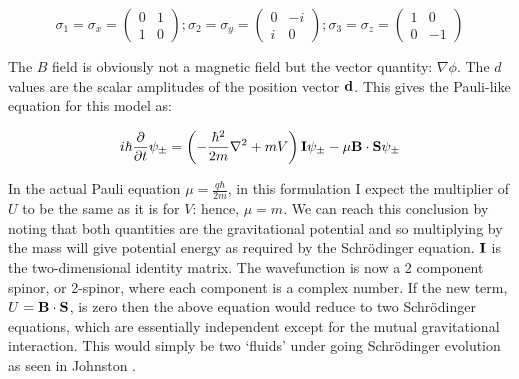 
\begin{equation}
\sigma_1 = \sigma_x =
\begin{pmatrix}
0&1\\
1&0
\end{pmatrix};
\sigma_2 = \sigma_y =
\begin{pmatrix}
0&-i\\
i&0
\end{pmatrix};
\sigma_3 = \sigma_z =
\begin{pmatrix}
1&0\\
0&-1
\end{pmatrix}
\end{equation}

\vspace*{0.5cm}

\noindent The $B$ field is obviously not a magnetic field but the vector quantity: $\nabla \phi$. The $d$ values are the scalar amplitudes of the position vector ${\bf d}$. This gives the Pauli-like equation for this model as:

\begin{equation}
i\hbar\frac{\partial}{\partial t}\psi_\pm = \left( -\frac{\hbar^2}{2m} \nabla^2 + mV \right) {\bf I} \psi_\pm -\mu {\bf B}  \cdot {\bf S} \psi_\pm
\end{equation}

\noindent In the actual Pauli equation $\mu = \frac{q \hbar}{2m}$, in this formulation I expect the multiplier of $U$ to be the same as it is for $V$: hence, $\mu = m$. We can reach this conclusion by noting that both quantities are the gravitational potential and so multiplying by the mass will give potential energy as required by the Schr\"odinger equation. ${\bf I}$ is the two-dimensional identity matrix. The wavefunction is now a 2 component spinor, or 2-spinor, where each component is a complex number. If the new term, $U = {\bf B} \cdot {\bf S}$, is zero then the above equation would reduce to two Schr\"odinger equations, which are essentially independent except for the mutual gravitational interaction. This would simply be two `fluids' under going Schr\"odinger evolution as seen in Johnston \citep{bib_rj}.

